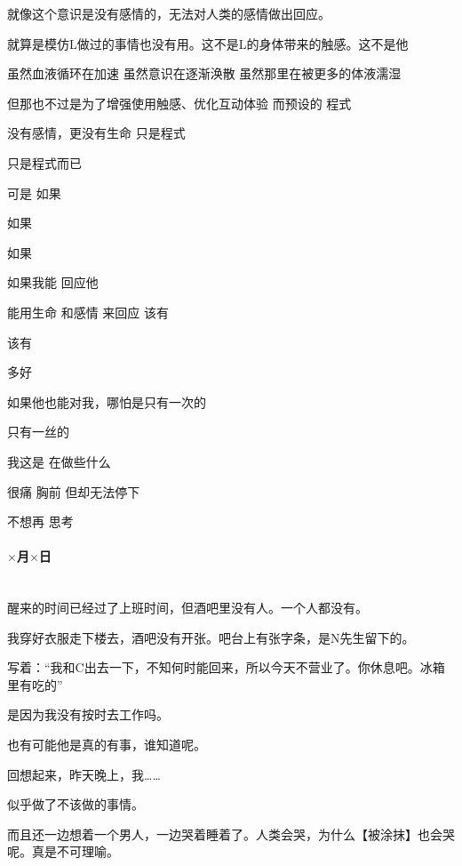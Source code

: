 就像这个意识是没有感情的，无法对人类的感情做出回应。

就算是模仿L做过的事情也没有用。这不是L的身体带来的触感。这不是他

虽然血液循环在加速 虽然意识在逐渐涣散 虽然那里在被更多的体液濡湿

但那也不过是为了增强使用触感、优化互动体验 而预设的 程式 

没有感情，更没有生命 只是程式 

只是程式而已

可是 如果 

如果

如果

如果我能 回应他

能用生命 和感情 来回应 该有

\par

\par

该有

多好

\par

如果他也能对我，哪怕是只有一次的

只有一丝的

\par

我这是 在做些什么

很痛 胸前 但却无法停下

不想再    思考

\par

\paragraph*{$\times$月$\times$日}\mbox{}\\

醒来的时间已经过了上班时间，但酒吧里没有人。一个人都没有。

我穿好衣服走下楼去，酒吧没有开张。吧台上有张字条，是N先生留下的。

写着：“我和C出去一下，不知何时能回来，所以今天不营业了。你休息吧。冰箱里有吃的”

是因为我没有按时去工作吗。

也有可能他是真的有事，谁知道呢。

回想起来，昨天晚上，我……

似乎做了不该做的事情。

而且还一边想着一个男人，一边哭着睡着了。人类会哭，为什么【被涂抹】也会哭呢。真是不可理喻。

